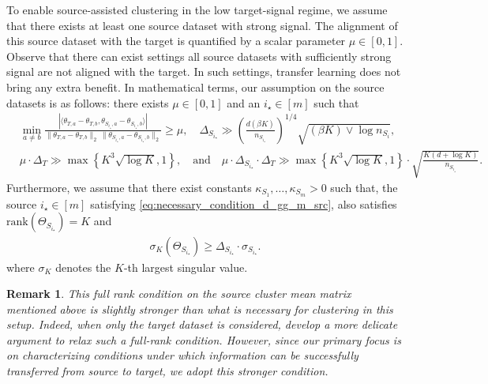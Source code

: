 \documentclass[10pt]{article}
\newtheorem{remark}{Remark}
\newcommand{\ip}[2]{\langle #1,#2\rangle}
\newcommand{\trg}{T}
\newcommand{\thetamcT}[1]{\theta_{\trg,#1}}
\newcommand{\DeltaT}{\Delta_{\trg}}
\newcommand{\src}{S}
\newcommand{\nSm}[1]{n_{\src_{#1}}}
\newcommand{\sigmaSm}[1]{\sigma_{\src_{#1}}}
\newcommand{\thetamSS}[2]{\theta_{\src_{#1},#2}}
\newcommand{\ThetamS}[1]{\Theta_{\src_{#1}}}
\newcommand{\DeltaSm}[1]{\Delta_{\src_{#1}}}
\begin{document}
To enable source-assisted clustering in the low target-signal regime, we assume that there exists at least one source dataset with strong signal. The alignment of this source dataset with the target is quantified by a scalar parameter $\mu \in [0,1]$. Observe that there can exist settings all source datasets with sufficiently strong signal are not aligned with the target. In such settings, transfer learning does not bring any extra benefit. 
In mathematical terms, our assumption on the source datasets is as follows: there exists $\mu\in[0,1]$ and an $i_\star\in[m]$ such that 
\begin{align}
\label{eq:necessary_condition_d_gg_m_src}
& \min_{a \neq b}
    \frac{|\ip{\thetamcT{a}-\thetamcT{b}}{\thetamSS{i_\star}{a}-\thetamSS{i_\star}{b}}|}
    {\|\thetamcT{a}-\thetamcT{b}\|_2\,\|\thetamSS{i_\star}{a}-\thetamSS{i_\star}{b}\|_2}
    \ge \mu,\quad \DeltaSm{i_\star}\gg \left(\frac{d(\beta K)}{\nSm{i_\star}}\right)^{1/4}\sqrt{(\beta K)\vee \log\nSm{i}},\\
    & \mu\cdot\DeltaT \gg \max\left\{K^3\sqrt{\log K},1\right\},\quad
\text{and}\quad
\mu\cdot\DeltaSm{i_\star}\cdot\DeltaT\gg \max\left\{K^3\sqrt{\log K},1\right\}\cdot
    \sqrt{\frac{K(d+\log K)}{\nSm{i_\star}}}.
\end{align}
Furthermore, we assume that there exist constants $\kappa_{\src_1},\ldots,\kappa_{\src_m}>0$ such that, the source $i_\star\in[m]$ satisfying \eqref{eq:necessary_condition_d_gg_m_src}, also satisfies $\mathrm{rank}\left(\ThetamS{i_\star}\right)=K$ and 
\begin{align}
\label{eq:singular_value_lower}
    \sigma_K\left(\ThetamS{i_\star}\right) \ge \DeltaSm{i_\star}\cdot \sigmaSm{i_\star}.
\end{align}
where $\sigma_K$ denotes the $K$-th largest singular value. 
\begin{remark}
This full rank condition on the source cluster mean matrix mentioned above is slightly stronger than what is necessary for clustering in this setup. Indeed, when only the target dataset is considered, \citet{LofflerZhangZhou2021} develop a more delicate argument to relax such a full-rank condition. However, since our primary focus is on characterizing conditions under which information can be successfully transferred from source to target, we adopt this stronger condition.
\end{remark}
\end{document}
